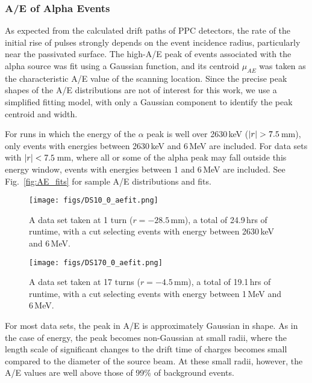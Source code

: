 \documentclass[groupedaddress,rmp,amsmath,amssymb,bibnotes,altaffilletter,twocolumn]{revtex4-1}
\begin{document}
\subsubsection{A/E of Alpha Events}
As expected from the calculated drift paths of PPC detectors, the rate of the initial rise of pulses strongly depends on the event incidence radius, particularly near the passivated surface. The high-A/E peak of events associated with the alpha source was fit using a Gaussian function, and its centroid $\mu_{AE}$ was taken as the characteristic A/E value of the scanning location. Since the precise peak shapes of the A/E distributions are not of interest for this work, we use a simplified fitting model, with only a Gaussian component to identify the peak centroid and width. 

For runs in which the energy of the $\alpha$ peak is well over 2630\,keV ($\abs{r} > 7.5$\,mm), only events with energies between 2630\,keV and 6\,MeV are included. For data sets with $\abs{r} < 7.5$\,mm, where all or some of the alpha peak may fall outside this energy window, events with energies between 1 and 6\,MeV are included. See Fig.~\ref{fig:AE_fits} for sample A/E distributions and fits. 

\begin{figure*}[]
 \centering
 \begin{subfigure}[]{.45\textwidth}
 \texttt{[image: figs/DS10\_0\_aefit.png]}
 \caption{A data set taken at 1 turn ($r = -28.5$\,mm), a total of 24.9\,hrs of runtime, with a cut selecting events with energy between 2630\,keV and 6\,MeV.}
\end{subfigure}
 \begin{subfigure}[]{.45\textwidth}
 \texttt{[image: figs/DS170\_0\_aefit.png]}
  \caption{A data set taken at 17 turns ($r = -4.5$\,mm), a total of 19.1\,hrs of runtime, with a cut selecting events with energy between 1\,MeV and 6\,MeV.} 
\end{subfigure}
\caption{Sample A/E distributions and Gaussian peak fits to alpha events.}
 \label{fig:AE_fits}
\end{figure*}

For most data sets, the peak in A/E is approximately Gaussian in shape. As in the case of energy, the peak becomes non-Gaussian at small radii, where the length scale of significant changes to the drift time of charges becomes small compared to the diameter of the source beam. At these small radii, however, the A/E values are well above those of 99\% of background events. 
\end{document}
